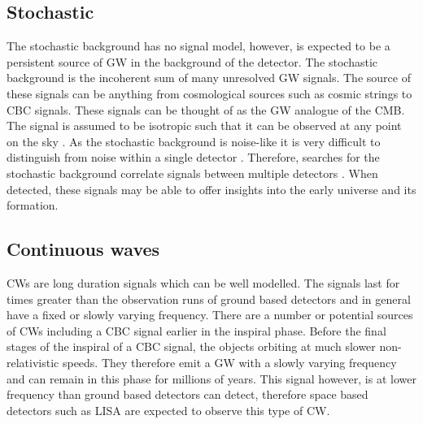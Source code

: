\subsection{Stochastic}

The stochastic background has no signal model, however, is expected to be a persistent source of \gls{GW} in the background of the detector. 
The stochastic background is the incoherent sum of many unresolved \gls{GW} signals.
The source of these signals can be anything from cosmological sources such as cosmic strings to \gls{CBC} signals.
These signals can be thought of as the \gls{GW} analogue of the \gls{CMB}.
The signal is assumed to be isotropic such that it can be observed at any point on the sky \citep{christensen2018StochasticGravitational}. 
As the stochastic background is noise-like it is very difficult to distinguish from noise within a single detector \citep{christensen2018StochasticGravitational}.
Therefore, searches for the stochastic background correlate signals between multiple detectors \citep{romano2019SearchesStochastic,christensen2018StochasticGravitational}. 
When detected, these signals may be able to offer insights into the early universe and its formation.



\subsection{\label{intro:sources:cw}Continuous waves}

\glspl{CW} are long duration signals which can be well modelled.
The signals last for times greater than the observation runs of ground based detectors and in general have a fixed or slowly varying frequency.
There are a number or potential sources of \glspl{CW} including a \gls{CBC} signal earlier in the inspiral phase.
Before the final stages of the inspiral of a \gls{CBC} signal, the objects orbiting at much slower non-relativistic speeds. They therefore emit a \gls{GW} with a slowly varying frequency and can remain in this phase for millions of years. 
This signal however, is at lower frequency than ground based detectors can detect, therefore space based detectors such as \gls{LISA} \citep{danzmann1996LISALaser} are expected to observe this type of \gls{CW}.


